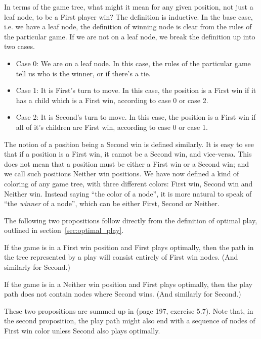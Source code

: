 In terms of the game tree, what might it mean for any given position, not just a leaf node, to be a First player win? The definition is inductive.
In the base case, i.e. we have a leaf node, the definition of winning node is clear from the rules of the particular game.
If we are not on a leaf node, we break the definition up into two cases.

\begin{definition}
\label{def:positionclasses}

\begin{itemize}

  \item Case 0: We are on a leaf node. In this case, the rules of the particular game tell us who is the winner, or if there's a tie.

  \item Case 1: It is First's turn to move. In this case, the position is a First win if it has a child which is a First win, according to case 0 or case 2.

  \item Case 2: It is Second's turn to move. In this case, the position is a First win if all of it's children are First win, according to case 0 or case 1.

\end{itemize}

\end{definition}
The notion of a position being a Second win is defined similarly.
It is easy to see that if a position is a First win, it cannot be a Second win, and vice-versa.
This does not mean that a position must be either a First win or a Second win; and we call such positions Neither win positions.
We have now defined a kind of coloring of any game tree, with three different colors: First win, Second win and Neither win.
Instead saying ``the color of a node'', it is more natural to speak of ``the \emph{winner} of a node'', which can be either First, Second or Neither.

The following two propositions follow directly from the definition of optimal play, outlined in section~\ref{sec:optimal_play}.

\begin{proposition}
If the game is in a First win position and First plays optimally, then the path in the tree represented by a play will consist entirely of First win nodes.
(And similarly for Second.)
\end{proposition}

\begin{proposition}
If the game is in a Neither win position and First plays optimally, then the play path does not contain nodes where Second wins.
(And similarly for Second.)
\end{proposition}
These two propositions are summed up in \citep{aimodernapproach} (page 197, exercise 5.7).
Note that, in the second proposition, the play path might also end with a sequence of nodes of First win color unless Second also plays optimally.

